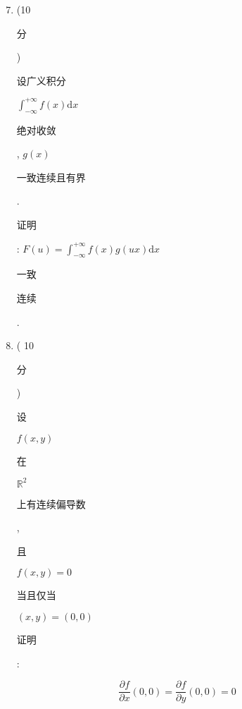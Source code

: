 \documentclass[10pt]{article}
\begin{document}
\begin{enumerate}
  \setcounter{enumi}{6}
  \item (10 \begin{CJK}{UTF8}{mj}分\end{CJK}) \begin{CJK}{UTF8}{mj}设广义积分\end{CJK} $\int_{-\infty}^{+\infty} f(x) \mathrm{d} x$ \begin{CJK}{UTF8}{mj}绝对收敛\end{CJK}, $g(x)$ \begin{CJK}{UTF8}{mj}一致连续且有界\end{CJK}. \begin{CJK}{UTF8}{mj}证明\end{CJK}: $F(u)=\int_{-\infty}^{+\infty} f(x) g(u x) \mathrm{d} x$ \begin{CJK}{UTF8}{mj}一致\end{CJK} \begin{CJK}{UTF8}{mj}连续\end{CJK}.

  \item ( 10 \begin{CJK}{UTF8}{mj}分\end{CJK}) \begin{CJK}{UTF8}{mj}设\end{CJK} $f(x, y)$ \begin{CJK}{UTF8}{mj}在\end{CJK} $\mathbb{R}^{2}$ \begin{CJK}{UTF8}{mj}上有连续偏导数\end{CJK}, \begin{CJK}{UTF8}{mj}且\end{CJK} $f(x, y)=0$ \begin{CJK}{UTF8}{mj}当且仅当\end{CJK} $(x, y)=(0,0)$ \begin{CJK}{UTF8}{mj}证明\end{CJK}:

\end{enumerate}
$$
\frac{\partial f}{\partial x}(0,0)=\frac{\partial f}{\partial y}(0,0)=0
$$
\end{document}
